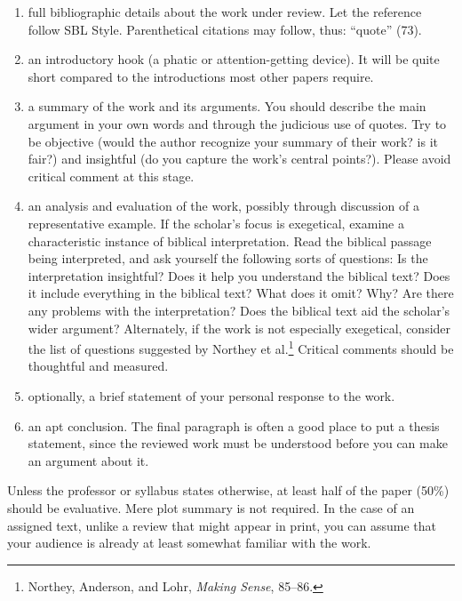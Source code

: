 \documentclass[11pt,twocolumn]{article}
\begin{document}
\begin{enumerate}

\item full bibliographic details about the work under review. Let the
reference follow SBL Style. Parenthetical citations may follow, thus:
“quote” (73).

\item an introductory hook (a phatic or attention-getting device). It
will be quite short compared to the introductions most other papers
require.

\item a summary of the work and its arguments. You should describe the
main argument in your own words and through the judicious use of quotes.
Try to be objective (would the author recognize your summary of their
work? is it fair?) and insightful (do you capture the work's central
points?). Please avoid critical comment at this stage.

\item an analysis and evaluation of the work, possibly through
discussion of a representative example. If the scholar's focus is
exegetical, examine a characteristic instance of biblical
interpretation. Read the biblical passage being interpreted, and ask
yourself the following sorts of questions: Is the interpretation
insightful? Does it help you understand the biblical text? Does it
include everything in the biblical text? What does it omit? Why? Are
there any problems with the interpretation? Does the biblical text aid
the scholar’s wider argument? Alternately, if the work is not especially
exegetical, consider the list of questions suggested by Northey et
al.\footnote{Northey, Anderson, and Lohr, \emph{Making Sense}, 85–86.}
Critical comments should be thoughtful and measured.

\item optionally, a brief statement of your personal response to the
work.

\item an apt conclusion. The final paragraph is often a good place to
put a thesis statement, since the reviewed work must be understood
before you can make an argument about it.

\end{enumerate}

Unless the professor or syllabus states otherwise, at least half of the
paper (50\%) should be evaluative. Mere plot summary is not required. In
the case of an assigned text, unlike a review that might appear in
print, you can assume that your audience is already at least somewhat
familiar with the work.
\end{document}

